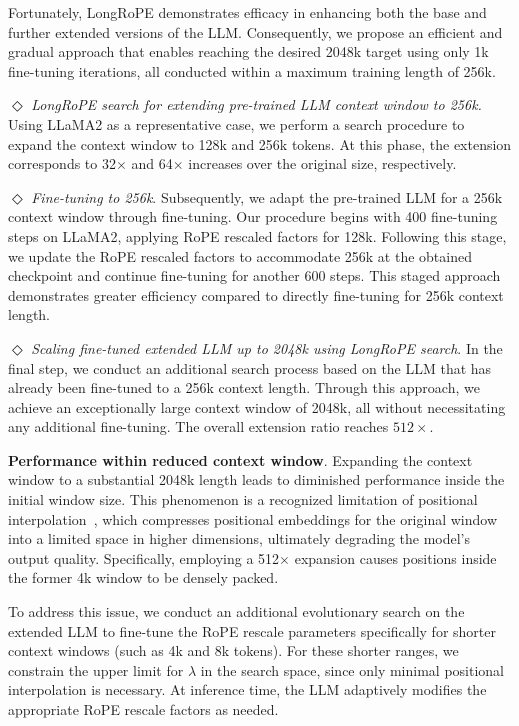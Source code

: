 Fortunately, LongRoPE demonstrates efficacy in enhancing both the base and further extended versions of the LLM. Consequently, we propose an efficient and gradual approach that enables reaching the desired 2048k target using only 1k fine-tuning iterations, all conducted within a maximum training length of 256k.

$\Diamond$ \textit{LongRoPE search for extending pre-trained LLM context window to 256k.} Using LLaMA2 as a representative case, we perform a search procedure to expand the context window to 128k and 256k tokens. At this phase, the extension corresponds to 32$\times$ and 64$\times$ increases over the original size, respectively.

$\Diamond$ \textit{Fine-tuning to 256k}. Subsequently, we adapt the pre-trained LLM for a 256k context window through fine-tuning. Our procedure begins with 400 fine-tuning steps on LLaMA2, applying RoPE rescaled factors for 128k. Following this stage, we update the RoPE rescaled factors to accommodate 256k at the obtained checkpoint and continue fine-tuning for another 600 steps. This staged approach demonstrates greater efficiency compared to directly fine-tuning for 256k context length.

$\Diamond$ \textit{Scaling fine-tuned extended LLM up to 2048k using LongRoPE search}. In the final step, we conduct an additional search process based on the LLM that has already been fine-tuned to a 256k context length. Through this approach, we achieve an exceptionally large context window of 2048k, all without necessitating any additional fine-tuning. The overall extension ratio reaches $512\times$.

\textbf{Performance within reduced context window}. Expanding the context window to a substantial 2048k length leads to diminished performance inside the initial window size. This phenomenon is a recognized limitation of positional interpolation~\cite{pi}, which compresses positional embeddings for the original window into a limited space in higher dimensions, ultimately degrading the model’s output quality. Specifically, employing a 512$\times$ expansion causes positions inside the former 4k window to be densely packed.

To address this issue, we conduct an additional evolutionary search on the extended LLM to fine-tune the RoPE rescale parameters specifically for shorter context windows (such as 4k and 8k tokens). For these shorter ranges, we constrain the upper limit for $\lambda$ in the search space, since only minimal positional interpolation is necessary. At inference time, the LLM adaptively modifies the appropriate RoPE rescale factors as needed.

